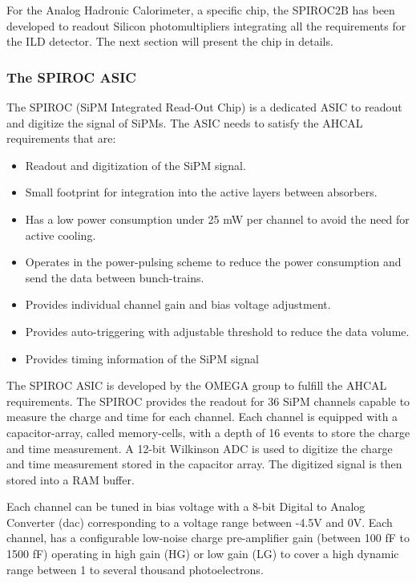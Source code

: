 For the Analog Hadronic Calorimeter, a specific chip, the SPIROC2B has been developed to readout Silicon photomultipliers integrating all the requirements for the ILD detector. The next section will present the chip in details.

\subsubsection{The SPIROC ASIC}
\label{sec:SPIROC2B}

The SPIROC (SiPM Integrated Read-Out Chip) \cite{5401891} is a dedicated ASIC to readout and digitize the signal of SiPMs. The ASIC needs to satisfy the AHCAL requirements that are:

\begin{itemize}
  \item Readout and digitization of the SiPM signal.
  \item Small footprint for integration into the active layers between absorbers.
  \item Has a low power consumption under 25 mW per channel to avoid the need for active cooling.
  \item Operates in the power-pulsing scheme to reduce the power consumption and send the data between bunch-trains.
  \item Provides individual channel gain and bias voltage adjustment.
  \item Provides auto-triggering with adjustable threshold to reduce the data volume.
  \item Provides timing information of the SiPM signal
\end{itemize}

The SPIROC ASIC is developed by the OMEGA group \cite{OmegaWeb} to fulfill the AHCAL requirements. The SPIROC provides the readout for 36 SiPM channels capable to measure the charge and time for each channel. Each channel is equipped with a capacitor-array, called memory-cells, with a depth of 16 events to store the charge and time measurement. A 12-bit Wilkinson ADC is used to digitize the charge and time measurement stored in the capacitor array. The digitized signal is then stored into a RAM buffer.

Each channel can be tuned in bias voltage with a 8-bit Digital to Analog Converter (\acrshort{dac}) corresponding to a voltage range between -4.5V and 0V. Each channel, has a configurable low-noise charge pre-amplifier gain (between 100 fF to 1500 fF) operating in high gain (HG) or low gain (LG) to cover a high dynamic range between 1 to several thousand photoelectrons.

